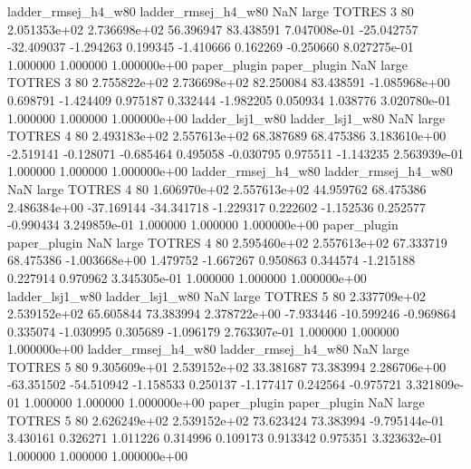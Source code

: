 ladder_rmsej_h4_w80 ladder_rmsej_h4_w80                   NaN      large   TOTRES                 3 80 2.051353e+02   2.736698e+02     56.396947      83.438591  7.047008e-01    -25.042757    -32.409037    -1.294263       0.199345 -1.410666   0.162269    -0.250660   8.027275e-01            1.000000        1.000000        1.000000e+00
       paper_plugin        paper_plugin                   NaN      large   TOTRES                 3 80 2.755822e+02   2.736698e+02     82.250084      83.438591 -1.085968e+00      0.698791     -1.424409     0.975187       0.332444 -1.982205   0.050934     1.038776   3.020780e-01            1.000000        1.000000        1.000000e+00
    ladder_lsj1_w80     ladder_lsj1_w80                   NaN      large   TOTRES                 4 80 2.493183e+02   2.557613e+02     68.387689      68.475386  3.183610e+00     -2.519141     -0.128071    -0.685464       0.495058 -0.030795   0.975511    -1.143235   2.563939e-01            1.000000        1.000000        1.000000e+00
ladder_rmsej_h4_w80 ladder_rmsej_h4_w80                   NaN      large   TOTRES                 4 80 1.606970e+02   2.557613e+02     44.959762      68.475386  2.486384e+00    -37.169144    -34.341718    -1.229317       0.222602 -1.152536   0.252577    -0.990434   3.249859e-01            1.000000        1.000000        1.000000e+00
       paper_plugin        paper_plugin                   NaN      large   TOTRES                 4 80 2.595460e+02   2.557613e+02     67.333719      68.475386 -1.003668e+00      1.479752     -1.667267     0.950863       0.344574 -1.215188   0.227914     0.970962   3.345305e-01            1.000000        1.000000        1.000000e+00
    ladder_lsj1_w80     ladder_lsj1_w80                   NaN      large   TOTRES                 5 80 2.337709e+02   2.539152e+02     65.605844      73.383994  2.378722e+00     -7.933446    -10.599246    -0.969864       0.335074 -1.030995   0.305689    -1.096179   2.763307e-01            1.000000        1.000000        1.000000e+00
ladder_rmsej_h4_w80 ladder_rmsej_h4_w80                   NaN      large   TOTRES                 5 80 9.305609e+01   2.539152e+02     33.381687      73.383994  2.286706e+00    -63.351502    -54.510942    -1.158533       0.250137 -1.177417   0.242564    -0.975721   3.321809e-01            1.000000        1.000000        1.000000e+00
       paper_plugin        paper_plugin                   NaN      large   TOTRES                 5 80 2.626249e+02   2.539152e+02     73.623424      73.383994 -9.795144e-01      3.430161      0.326271     1.011226       0.314996  0.109173   0.913342     0.975351   3.323632e-01            1.000000        1.000000        1.000000e+00
